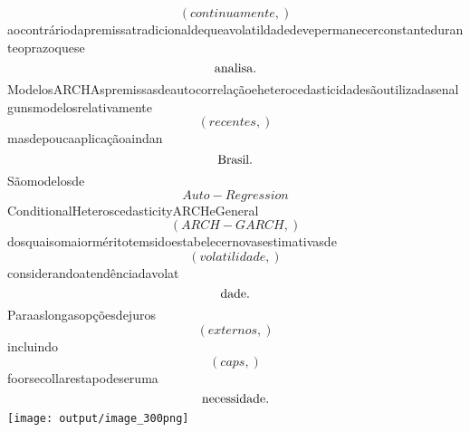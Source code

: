 \documentclass{article}
\begin{document}
\begin{equation}
\left( continuamente,\right)
\end{equation}aocontráriodapremissatradicionaldequeavolatildadedevepermanecerconstanteduranteoprazoquese\begin{equation}
$analisa.$
\end{equation}ModelosARCHAspremissasdeautocorrelaçãoeheterocedasticidadesãoutilizadasenalgunsmodelosrelativamente\begin{equation}
\left( recentes,\right)
\end{equation}masdepoucaaplicaçãoaindan\begin{equation}
$Brasil.$
\end{equation}Sãomodelosde\begin{equation}
Auto - Regression
\end{equation}ConditionalHeteroscedasticityARCHeGeneral\begin{equation}
\left( ARCH - GARCH,\right)
\end{equation}dosquaisomaiorméritotemsidoestabelecernovasestimativasde\begin{equation}
\left( volatilidade,\right)
\end{equation}considerandoatendênciadavolat\begin{equation}
$dade.$
\end{equation}Paraaslongasopçõesdejuros\begin{equation}
\left( externos,\right)
\end{equation}incluindo\begin{equation}
\left( caps,\right)
\end{equation}foorsecollarestapodeseruma\begin{equation}
$necessidade.$
\end{equation}\texttt{[image: output/image\_300png]}
\end{document}
